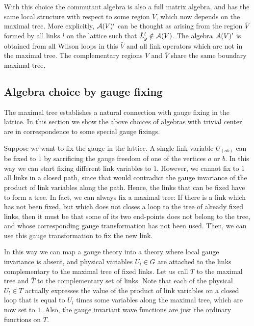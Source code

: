 \documentclass[12pt,a4paper]{article}
\begin{document}
With this choice the commutant algebra is also a full matrix algebra, and has the same local structure with respect to 
some region $\bar{V}$, which now depends on the maximal tree. More explicitly, ${\cal A}(V)^\prime$ can be thought as arising from the region $\bar{V}$
 formed by all links $l$ on the lattice such that $\hat{L}_g^l\notin {\cal A}(V)$. The algebra ${\cal A}(V)^\prime$ is obtained from all Wilson loops in this $\bar{V}$ and all link operators which are not in the maximal tree. The complementary regions $V$ and $\bar{V}$ share the same boundary maximal tree.  

\subsection{Algebra choice by gauge fixing}

The maximal tree establishes a natural connection with gauge fixing in the lattice. In this section we show the above choices of 
algebras with trivial center are in correspondence to some special gauge fixings. 

Suppose we want to fix the gauge in the lattice. 
A single link variable $U_{(ab)}$ can be fixed to $1$ by sacrificing the gauge freedom of one of the vertices $a$ or $b$. In this way we can 
start fixing different link variables to $1$. However, we cannot fix to $1$ all links in a closed path, since that would contradict the gauge invariance 
of the product of link variables along the path. Hence, the links that can be fixed have to form a tree. In fact, we can always fix a maximal 
tree: If there is a link which has not been fixed, but which does not closes a loop to the tree of already fixed links, then it must be that 
some of its two end-points does not belong to the tree, and whose corresponding gauge transformation has not been used. Then, we can use this gauge 
transformation to fix the new link.  



In this way we can map a gauge theory into a theory where local gauge invariance is absent, and physical variables $U_l\in G$ are attached to the 
links complementary to the maximal tree of fixed links. Let us call $T$ to the maximal tree and $\bar{T}$ to the complementary set of links. 
Note that each of the physical $U_l\in \bar{T}$ actually expresses the value of the product of link variables on a closed loop that is equal 
to $U_l$ times some variables along the maximal tree, which are now set to $1$. Also, the gauge invariant wave functions are just the 
ordinary functions on $\bar{T}$.
\end{document}
